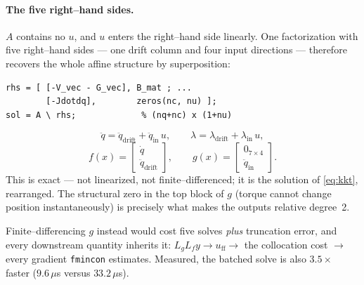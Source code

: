 \documentclass[11pt,a4paper]{article}
\newcommand{\code}[1]{\texttt{#1}}          %
\begin{document}
\paragraph{The five right--hand sides.}
$A$ contains no $u$, and $u$ enters the right--hand side linearly. One
factorization with five right--hand sides --- one drift column and four input
directions --- therefore recovers the whole affine structure by superposition:
\begin{lstlisting}
rhs = [ [-V_vec - G_vec], B_mat ; ...
        [-Jdotdq],        zeros(nc, nu) ];
sol = A \ rhs;             % (nq+nc) x (1+nu)
\end{lstlisting}
\begin{equation}
  \ddot q = \ddot q_{\text{drift}} + \ddot q_{\text{in}}\,u,
  \qquad
  \lambda = \lambda_{\text{drift}} + \lambda_{\text{in}}\,u,
\end{equation}
\begin{equation}
  f(x) = \begin{bmatrix} \dot q \\ \ddot q_{\text{drift}}\end{bmatrix},
  \qquad
  g(x) = \begin{bmatrix} 0_{7\times4} \\ \ddot q_{\text{in}}\end{bmatrix}.
\end{equation}
This is exact --- not linearized, not finite--differenced; it is the solution of
\eqref{eq:kkt}, rearranged. The structural zero in the top block of $g$ (torque
cannot change position instantaneously) is precisely what makes the outputs
relative degree~2.

Finite--differencing $g$ instead would cost five solves \emph{plus} truncation
error, and every downstream quantity inherits it: $L_gL_fy \to u_{\mathrm{ff}}
\to$ the collocation cost $\to$ every gradient \code{fmincon} estimates.
Measured, the batched solve is also $3.5\times$ faster
($9.6\,\mu$s versus $33.2\,\mu$s).
\end{document}
